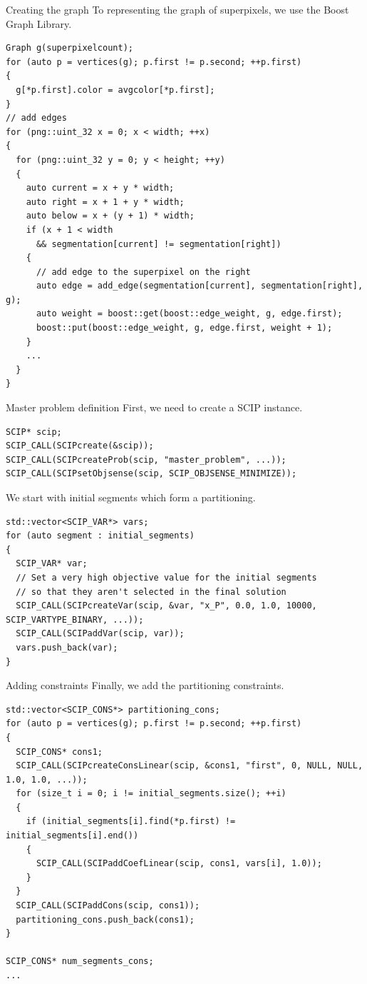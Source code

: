 \documentclass[fleqn]{beamer}
\begin{document}
\begin{frame}[fragile]{Creating the graph}
To representing the graph of superpixels, we use the Boost Graph Library.

\begin{verbatim}
Graph g(superpixelcount);
for (auto p = vertices(g); p.first != p.second; ++p.first)
{
  g[*p.first].color = avgcolor[*p.first];
}	
// add edges
for (png::uint_32 x = 0; x < width; ++x)
{
  for (png::uint_32 y = 0; y < height; ++y)
  {
    auto current = x + y * width;
    auto right = x + 1 + y * width;
    auto below = x + (y + 1) * width;
    if (x + 1 < width
      && segmentation[current] != segmentation[right])
    {
      // add edge to the superpixel on the right
      auto edge = add_edge(segmentation[current], segmentation[right], g);
      auto weight = boost::get(boost::edge_weight, g, edge.first);
      boost::put(boost::edge_weight, g, edge.first, weight + 1);
    }
    ...
  }
}
\end{verbatim}
\end{frame}

\begin{frame}[fragile]{Master problem definition}
First, we need to create a SCIP instance.
\begin{verbatim}
SCIP* scip;
SCIP_CALL(SCIPcreate(&scip));
SCIP_CALL(SCIPcreateProb(scip, "master_problem", ...));
SCIP_CALL(SCIPsetObjsense(scip, SCIP_OBJSENSE_MINIMIZE));
\end{verbatim}

We start with initial segments which form a partitioning.
\begin{verbatim}
std::vector<SCIP_VAR*> vars;
for (auto segment : initial_segments)
{
  SCIP_VAR* var;
  // Set a very high objective value for the initial segments
  // so that they aren't selected in the final solution
  SCIP_CALL(SCIPcreateVar(scip, &var, "x_P", 0.0, 1.0, 10000, SCIP_VARTYPE_BINARY, ...));
  SCIP_CALL(SCIPaddVar(scip, var));
  vars.push_back(var);
}
\end{verbatim}
\end{frame}

\begin{frame}[fragile]{Adding constraints}
Finally, we add the partitioning constraints.
\begin{verbatim}
std::vector<SCIP_CONS*> partitioning_cons;
for (auto p = vertices(g); p.first != p.second; ++p.first)
{
  SCIP_CONS* cons1;
  SCIP_CALL(SCIPcreateConsLinear(scip, &cons1, "first", 0, NULL, NULL, 1.0, 1.0, ...));
  for (size_t i = 0; i != initial_segments.size(); ++i)
  {
    if (initial_segments[i].find(*p.first) != initial_segments[i].end())
    {
      SCIP_CALL(SCIPaddCoefLinear(scip, cons1, vars[i], 1.0));
    }
  }
  SCIP_CALL(SCIPaddCons(scip, cons1));
  partitioning_cons.push_back(cons1);
}

SCIP_CONS* num_segments_cons;
...
\end{verbatim}
\end{frame}
\end{document}
